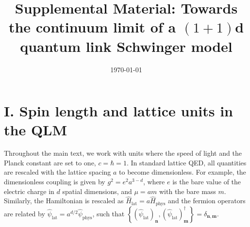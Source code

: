 \documentclass[aps,prl,reprint,twocolumn,superscriptaddress,floatfix,nofootinbib]{revtex4-1}
\makeatletter
\def\maketitle{
	\@author@finish
	\title@column\titleblock@produce
	\suppressfloats[t]}
\makeatother
\begin{document}
	
	
\clearpage

\title{Supplemental Material: Towards the continuum limit of a $(1+1)$d quantum link Schwinger model}
\date{\today}


\maketitle
{}





\section{I. Spin length and lattice units in the QLM}
Throughout the main text, we work with units where the speed of light and the Planck constant are set to one, $c = \hbar = 1$. In standard lattice QED, all quantities are rescaled with the lattice spacing $a$ to become dimensionless. For example, the dimensionless coupling is given by $g^2 = e^2 a^{3-d}$, where $e$ is the bare value of the electric charge in $d$ spatial dimensions, and $\mu = a m$ with the bare mass $m$. Similarly, the Hamiltonian is rescaled as $\hat{H}_\text{lat} = a \hat{H}_\text{phys}$ and the fermion operators are related by $\hat{\psi}_\text{lat} = a^{d/2} \hat{\psi}_\text{phys}$, such that $\left\lbrace\left(\hat{\psi}_\text{lat}\right)_\mathbf{n}, \left(\hat{\psi}_\text{lat}\right)_\mathbf{m}^\dagger \right\rbrace = \delta_{\mathbf{n}, \mathbf{m}}$.
\end{document}
